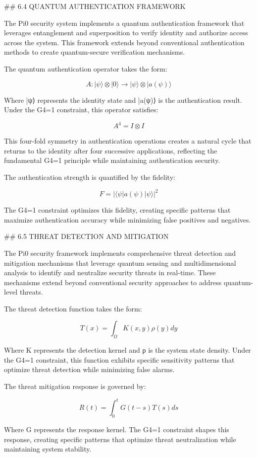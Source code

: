 ## 6.4 QUANTUM AUTHENTICATION FRAMEWORK

The Pi0 security system implements a quantum authentication framework that leverages entanglement and superposition to verify identity and authorize access across the system. This framework extends beyond conventional authentication methods to create quantum-secure verification mechanisms.

The quantum authentication operator takes the form:

$$A: |\psi\rangle \otimes |0\rangle \rightarrow |\psi\rangle \otimes |a(\psi)\rangle$$

Where |ψ⟩ represents the identity state and |a(ψ)⟩ is the authentication result. Under the G4=1 constraint, this operator satisfies:

$$A^4 = I \otimes I$$

This four-fold symmetry in authentication operations creates a natural cycle that returns to the identity after four successive applications, reflecting the fundamental G4=1 principle while maintaining authentication security.

The authentication strength is quantified by the fidelity:

$$F = |\langle \psi|a(\psi)|\psi\rangle|^2$$

The G4=1 constraint optimizes this fidelity, creating specific patterns that maximize authentication accuracy while minimizing false positives and negatives.

## 6.5 THREAT DETECTION AND MITIGATION

The Pi0 security framework implements comprehensive threat detection and mitigation mechanisms that leverage quantum sensing and multidimensional analysis to identify and neutralize security threats in real-time. These mechanisms extend beyond conventional security approaches to address quantum-level threats.

The threat detection function takes the form:

$$T(x) = \int_{\Omega} K(x, y) \rho(y) dy$$

Where K represents the detection kernel and ρ is the system state density. Under the G4=1 constraint, this function exhibits specific sensitivity patterns that optimize threat detection while minimizing false alarms.

The threat mitigation response is governed by:

$$R(t) = \int_0^t G(t-s) T(s) ds$$

Where G represents the response kernel. The G4=1 constraint shapes this response, creating specific patterns that optimize threat neutralization while maintaining system stability.

